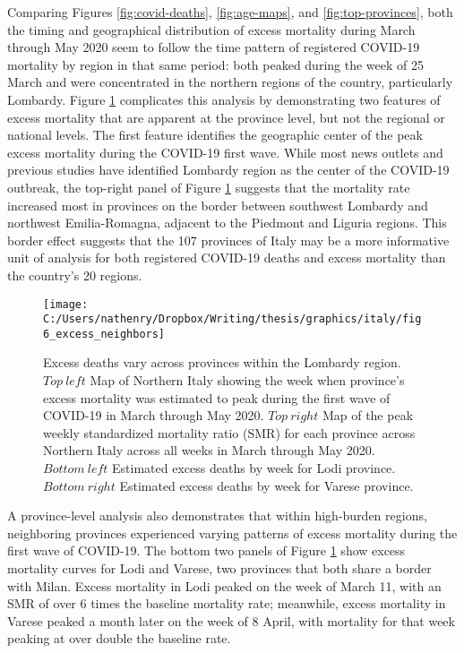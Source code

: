 \documentclass[
]{article}
\begin{document}
Comparing Figures \ref{fig:covid-deaths}, \ref{fig:age-maps}, and \ref{fig:top-provinces}, both the timing and geographical distribution of excess mortality during March through May 2020 seem to follow the time pattern of registered COVID-19 mortality by region in that same period: both peaked during the week of 25 March and were concentrated in the northern regions of the country, particularly Lombardy. Figure \ref{fig:excess-neighbors} complicates this analysis by demonstrating two features of excess mortality that are apparent at the province level, but not the regional or national levels. The first feature identifies the geographic center of the peak excess mortality during the COVID-19 first wave. While most news outlets and previous studies have identified Lombardy region as the center of the COVID-19 outbreak, the top-right panel of Figure \ref{fig:excess-neighbors} suggests that the mortality rate increased most in provinces on the border between southwest Lombardy and northwest Emilia-Romagna, adjacent to the Piedmont and Liguria regions. This border effect suggests that the 107 provinces of Italy may be a more informative unit of analysis for both registered COVID-19 deaths and excess mortality than the country's 20 regions.

\begin{figure}[H]

{\centering \texttt{[image: C:/Users/nathenry/Dropbox/Writing/thesis/graphics/italy/fig6\_excess\_neighbors]} 

}

\caption{Excess deaths vary across provinces within the Lombardy region. \(Top\ left\) Map of Northern Italy showing the week when province’s excess mortality was estimated to peak during the first wave of COVID-19 in March through May 2020. \(Top\ right\) Map of the peak weekly standardized mortality ratio (SMR) for each province across Northern Italy across all weeks in March through May 2020. \(Bottom\ left\) Estimated excess deaths by week for Lodi province. \(Bottom\ right\) Estimated excess deaths by week for Varese province.}\label{fig:excess-neighbors}
\end{figure}

A province-level analysis also demonstrates that within high-burden regions, neighboring provinces experienced varying patterns of excess mortality during the first wave of COVID-19. The bottom two panels of Figure \ref{fig:excess-neighbors} show excess mortality curves for Lodi and Varese, two provinces that both share a border with Milan. Excess mortality in Lodi peaked on the week of March 11, with an SMR of over 6 times the baseline mortality rate; meanwhile, excess mortality in Varese peaked a month later on the week of 8 April, with mortality for that week peaking at over double the baseline rate.
\end{document}
